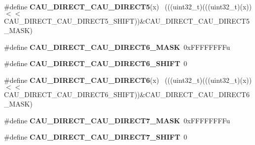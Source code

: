 \begin{DoxyCompactItemize}
\item 
\hypertarget{group___c_a_u___register___masks_gabcdfe995c66b4024be52fe044fee3fb2}{}\#define {\bfseries C\+A\+U\+\_\+\+D\+I\+R\+E\+C\+T\+\_\+\+C\+A\+U\+\_\+\+D\+I\+R\+E\+C\+T5}(x)                            ~(((uint32\+\_\+t)(((uint32\+\_\+t)(x))$<$$<$C\+A\+U\+\_\+\+D\+I\+R\+E\+C\+T\+\_\+\+C\+A\+U\+\_\+\+D\+I\+R\+E\+C\+T5\+\_\+\+S\+H\+I\+F\+T))\&C\+A\+U\+\_\+\+D\+I\+R\+E\+C\+T\+\_\+\+C\+A\+U\+\_\+\+D\+I\+R\+E\+C\+T5\+\_\+\+M\+A\+S\+K)\label{group___c_a_u___register___masks_gabcdfe995c66b4024be52fe044fee3fb2}

\item 
\hypertarget{group___c_a_u___register___masks_ga971c00d2038809c2c31c18f8942807ec}{}\#define {\bfseries C\+A\+U\+\_\+\+D\+I\+R\+E\+C\+T\+\_\+\+C\+A\+U\+\_\+\+D\+I\+R\+E\+C\+T6\+\_\+\+M\+A\+S\+K}~0x\+F\+F\+F\+F\+F\+F\+F\+Fu\label{group___c_a_u___register___masks_ga971c00d2038809c2c31c18f8942807ec}

\item 
\hypertarget{group___c_a_u___register___masks_ga4dea5b62b401604587b9fa6ed0d98f65}{}\#define {\bfseries C\+A\+U\+\_\+\+D\+I\+R\+E\+C\+T\+\_\+\+C\+A\+U\+\_\+\+D\+I\+R\+E\+C\+T6\+\_\+\+S\+H\+I\+F\+T}~0\label{group___c_a_u___register___masks_ga4dea5b62b401604587b9fa6ed0d98f65}

\item 
\hypertarget{group___c_a_u___register___masks_gaa1f477d149c77a1c5d2a2f3567a5c050}{}\#define {\bfseries C\+A\+U\+\_\+\+D\+I\+R\+E\+C\+T\+\_\+\+C\+A\+U\+\_\+\+D\+I\+R\+E\+C\+T6}(x)                            ~(((uint32\+\_\+t)(((uint32\+\_\+t)(x))$<$$<$C\+A\+U\+\_\+\+D\+I\+R\+E\+C\+T\+\_\+\+C\+A\+U\+\_\+\+D\+I\+R\+E\+C\+T6\+\_\+\+S\+H\+I\+F\+T))\&C\+A\+U\+\_\+\+D\+I\+R\+E\+C\+T\+\_\+\+C\+A\+U\+\_\+\+D\+I\+R\+E\+C\+T6\+\_\+\+M\+A\+S\+K)\label{group___c_a_u___register___masks_gaa1f477d149c77a1c5d2a2f3567a5c050}

\item 
\hypertarget{group___c_a_u___register___masks_gab06d5ca76014069c1511818f08442a16}{}\#define {\bfseries C\+A\+U\+\_\+\+D\+I\+R\+E\+C\+T\+\_\+\+C\+A\+U\+\_\+\+D\+I\+R\+E\+C\+T7\+\_\+\+M\+A\+S\+K}~0x\+F\+F\+F\+F\+F\+F\+F\+Fu\label{group___c_a_u___register___masks_gab06d5ca76014069c1511818f08442a16}

\item 
\hypertarget{group___c_a_u___register___masks_ga779a3fffe17b85f4298a9d6b2265d543}{}\#define {\bfseries C\+A\+U\+\_\+\+D\+I\+R\+E\+C\+T\+\_\+\+C\+A\+U\+\_\+\+D\+I\+R\+E\+C\+T7\+\_\+\+S\+H\+I\+F\+T}~0\label{group___c_a_u___register___masks_ga779a3fffe17b85f4298a9d6b2265d543}


\end{DoxyCompactItemize}
